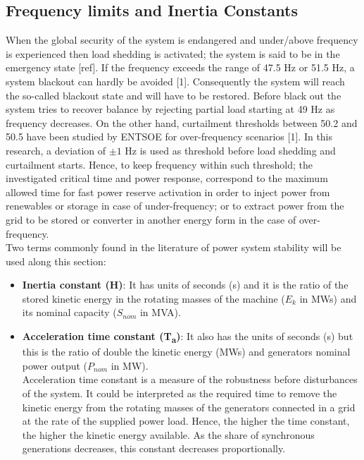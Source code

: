 \subsection{Frequency limits and Inertia Constants}
When the global security of the system is endangered and under/above frequency is experienced then load shedding is activated; the system is said to be in the emergency state [ref]. If the frequency exceeds the range of 47.5 Hz or 51.5 Hz, a system blackout can hardly be avoided [1]. Consequently the system will reach the so-called blackout state and will have to be restored. Before black out the system tries to recover balance by rejecting partial load starting at 49 Hz as frequency decreases. On the other hand, curtailment thresholds between 50.2 and 50.5 have been studied by ENTSOE for over-frequency scenarios [1]. In this research, a deviation of $ \pm1 $ Hz is used as threshold before load shedding and curtailment starts. Hence, to keep frequency within such threshold; the investigated critical time and power response, correspond to the maximum allowed time for fast power reserve activation in order to inject power from renewables or storage in case of under-frequency; or to extract power from the grid to be stored or converter in another energy form in the case of over-frequency.\\

Two terms commonly found in the literature of power system stability will be used along this section:

\begin{itemize}[leftmargin=*,labelsep=5.8mm]
	\item \textbf{Inertia constant (H)}: It has units of seconds (s) and it is the ratio of the stored kinetic energy in the rotating masses of the machine ($E_k$ in MWs) and its nominal capacity ($S_{nom}$ in MVA).\\
	\item \textbf{Acceleration time constant (T\textsubscript{a})}: It also has the units of seconds (s) but this is the ratio of double the kinetic energy (MWs) and generators nominal power output ($P_{nom}$ in MW).\\
	 Acceleration time constant is a measure of the robustness before disturbances of the system. It could be interpreted as the required time to remove the kinetic energy from the rotating masses of the generators connected in a grid at the rate of the supplied power load. Hence, the higher the time constant, the higher the kinetic energy available. As the share of synchronous generations decreases, this constant decreases proportionally.
\end{itemize}

